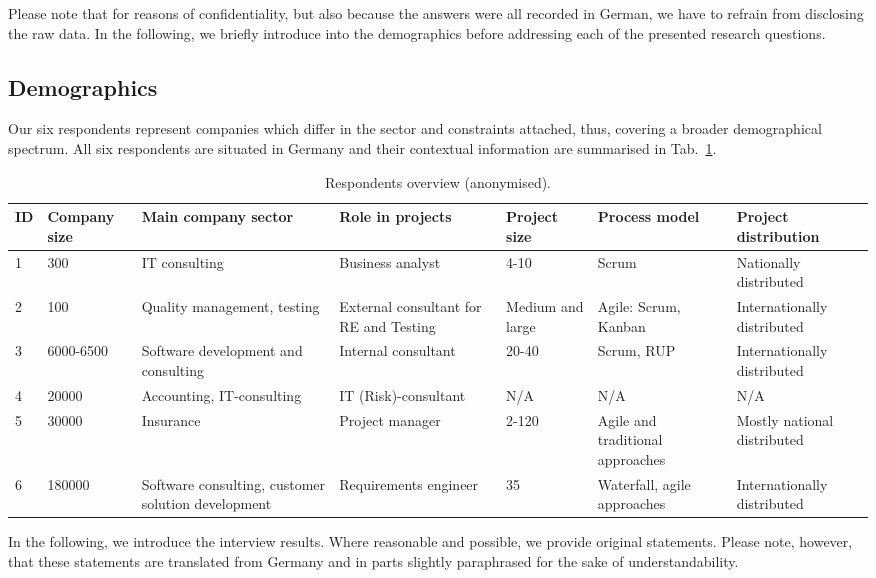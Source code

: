 \documentclass[lnbip]{svmultln}
\begin{document}
Please note that for reasons of confidentiality, but also because the answers were all recorded in German, we have to refrain from disclosing the raw data. In the following, we briefly introduce into the demographics before addressing each of the presented research questions.


\subsection{Demographics}

Our six respondents represent companies which differ in the sector and constraints attached, thus, covering a broader demographical spectrum. All six respondents are situated in Germany and their contextual information are summarised in Tab.~\ref{tab:ContextInformation}.

\begin{table}[htbp]
\centering
\scriptsize
\begin{tabular}  {p{}p{}p{2cm}p{2cm}p{2cm}p{2cm}p{2cm}}
\toprule
\textbf{ID} &\textbf{Company size}&\textbf{Main company sector}&\textbf{Role in projects}&\textbf{Project size}&\textbf{Process model}&\textbf{Project distribution}\\
\midrule
	1&300&IT consulting&Business analyst&4-10& Scrum& Nationally distributed\\ 
	2&100&Quality management, testing&External consultant for RE and Testing&Medium and large&Agile: Scrum, Kanban& Internationally distributed\\ 
	3&6000-6500&Software development and consulting&Internal consultant&20-40&Scrum, RUP&Internationally distributed\\ 
	4&20000&Accounting, IT-consulting&IT (Risk)-consultant&N/A&N/A&N/A\\ 
	5&30000&Insurance&Project manager&2-120&Agile and traditional approaches&Mostly national distributed\\ 
	6&180000&Software consulting, customer solution development&Requirements engineer &35&Waterfall, agile approaches&Internationally distributed\\
\bottomrule
\end{tabular}
\caption{Respondents overview (anonymised).}
\label{tab:ContextInformation}
\end{table}

In the following, we introduce the interview results. Where reasonable and possible, we provide original statements. Please note, however, that these statements are translated from Germany and in parts slightly paraphrased for the sake of understandability. 
\end{document}
